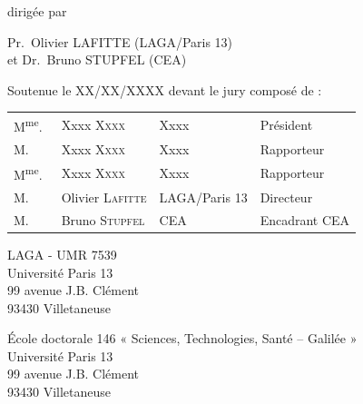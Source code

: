 \begin{titlepage}
\begin{center}
{\large dirigée par}

{
\large
    Pr.~Olivier LAFITTE (LAGA/Paris 13)\\
    et Dr.~Bruno STUPFEL (CEA)
}



{\Large Soutenue le XX/XX/XXXX devant le jury composé de :}

{\Large
\begin{tabular}{l@{\hskip 0cm}lll}
M\textsuperscript{me}.~&Xxxx \textsc{Xxxx} & Xxxx & Président
\\
M.&Xxxx \textsc{Xxxx} & Xxxx & Rapporteur
\\
M\textsuperscript{me}.&Xxxx \textsc{Xxxx} & Xxxx & Rapporteur
\\
M.&Olivier \textsc{Lafitte} & LAGA/Paris 13 & Directeur
\\
M.~&Bruno \textsc{Stupfel} & CEA & Encadrant CEA
\\
\end{tabular}
}

\end{center}

\newpage
\thispagestyle{empty}
\vspace*{\fill}

\noindent
\begin{center}
\begin{minipage}[t]{0.5\textwidth}
LAGA - UMR 7539\\
Université Paris 13\\
99 avenue J.B. Clément\\
93430 Villetaneuse
\end{minipage}%
%
\hfill%
%
\begin{minipage}[t]{0.5\textwidth}
École doctorale 146 « Sciences, Technologies, Santé – Galilée »\\
Université Paris 13\\
99 avenue J.B. Clément\\
93430 Villetaneuse
\end{minipage}
\end{center}



\end{titlepage}
\hypersetup{pageanchor=true}
\cleardoublepage
